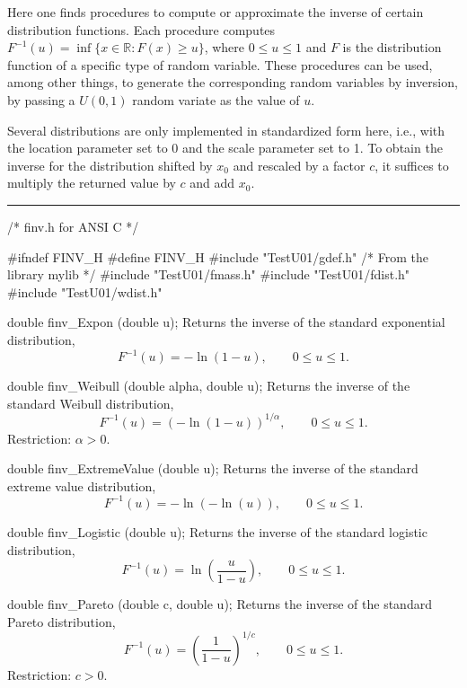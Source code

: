 
Here one finds procedures to compute or approximate the 
inverse of certain distribution functions.  
Each procedure computes $F^{-1}(u) = \inf\{x\in\mathbb{R} : F(x)\ge u\}$,
where $0\le u\le 1$ and $F$
is the distribution function of a specific type of random variable.
These procedures can be used, among other things, to generate
the corresponding random variables by inversion, by passing a
$U(0,1)$ random variate as the value of $u$.

Several distributions are only implemented in standardized form here,
i.e., with the location parameter set to 0 and the scale parameter
set to 1.  To obtain the inverse for the distribution shifted 
by $x_0$ and rescaled by a factor $c$, it suffices to multiply the
returned value by $c$ and add $x_0$.

\bigskip\hrule\medskip
\code\hide
/* finv.h for ANSI C */

#ifndef FINV_H
#define FINV_H
\endhide
#include "TestU01/gdef.h"     /* From the library mylib */
#include "TestU01/fmass.h"
#include "TestU01/fdist.h"
#include "TestU01/wdist.h"
\endcode


\code

double finv_Expon (double u);
\endcode
  \tab
  Returns the inverse of the standard exponential distribution,
$$
     F^{-1}(u) = -\ln (1-u), \qquad  0 \le u \le 1.
$$
 \endtab
\code

double finv_Weibull (double alpha, double u);
\endcode
  \tab
  Returns the inverse of the standard Weibull distribution,
$$
     F^{-1}(u) = \left(-\ln (1-u) \right)^{1/\alpha}, \qquad  0 \le u \le 1.
$$
  Restriction: $\alpha > 0$.
 \endtab
\code


double finv_ExtremeValue (double u);
\endcode
  \tab
  Returns the inverse of the standard extreme value distribution,
$$
     F^{-1}(u) = -\ln (-\ln (u)), \qquad  0 \le u \le 1.
$$
 \endtab
\code

double finv_Logistic (double u);
\endcode
  \tab
  Returns the inverse of the standard logistic distribution,
$$
     F^{-1}(u) = \ln  \left(\frac{u}{1-u}\right), \qquad  0 \le u \le 1.
$$
 \endtab
\code

double finv_Pareto (double c, double u);
\endcode
  \tab
  Returns the inverse of the standard Pareto distribution,
$$
     F^{-1}(u) = \left(\frac 1 {1 - u}\right)^{1/c}, 
          \qquad  0 \le u \le 1.
$$
  Restriction: $c > 0$.
 \endtab
\code


